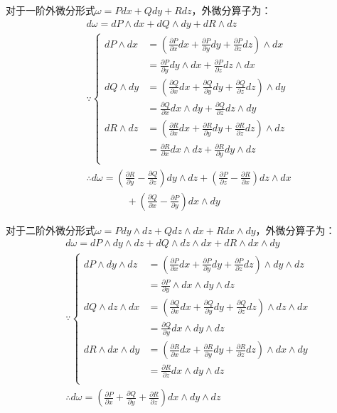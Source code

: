 对于一阶外微分形式$\omega =Pdx+Qdy+Rdz$，外微分算子为：
\begin{align*}
&d\omega =dP\land dx+dQ\land dy+dR\land dz \\
&\because \left\{ \begin{aligned}
	dP\land dx&=\left( \frac{\partial P}{\partial x}dx+\frac{\partial P}{\partial y}dy+\frac{\partial P}{\partial z}dz \right) \land dx\\
	&=\frac{\partial P}{\partial y}dy\land dx+\frac{\partial P}{\partial z}dz\land dx\\
	dQ\land dy&=\left( \frac{\partial Q}{\partial x}dx+\frac{\partial Q}{\partial y}dy+\frac{\partial Q}{\partial z}dz \right) \land dy\\
	&=\frac{\partial Q}{\partial x}dx\land dy+\frac{\partial Q}{\partial z}dz\land dy\\
	dR\land dz&=\left( \frac{\partial R}{\partial x}dx+\frac{\partial R}{\partial y}dy+\frac{\partial R}{\partial z}dz \right) \land dz\\
	&=\frac{\partial R}{\partial x}dx\land dz+\frac{\partial R}{\partial y}dy\land dz\\
\end{aligned} \right. \\
&\therefore d\omega =\left( \frac{\partial R}{\partial y}-\frac{\partial Q}{\partial z} \right) dy\land dz+\left( \frac{\partial P}{\partial z}-\frac{\partial R}{\partial x} \right) dz\land dx \\
& \qquad \qquad +\left( \frac{\partial Q}{\partial x}-\frac{\partial P}{\partial y} \right) dx\land dy
\end{align*}

对于二阶外微分形式$\omega =Pdy\land dz+Qdz\land dx+Rdx\land dy$，外微分算子为：
\begin{align*}
&d\omega =dP\land dy\land dz+dQ\land dz\land dx+dR\land dx\land dy \\
&\because \left\{ \begin{aligned}
	dP\land dy\land dz&=\left( \frac{\partial P}{\partial x}dx+\frac{\partial P}{\partial y}dy+\frac{\partial P}{\partial z}dz \right) \land dy\land dz\\
	&=\frac{\partial P}{\partial y}\land dx\land dy\land dz\\
	dQ\land dz\land dx&=\left( \frac{\partial Q}{\partial x}dx+\frac{\partial Q}{\partial y}dy+\frac{\partial Q}{\partial z}dz \right) \land dz\land dx\\
	&=\frac{\partial Q}{\partial y}dx\land dy\land dz\\
	dR\land dx\land dy&=\left( \frac{\partial R}{\partial x}dx+\frac{\partial R}{\partial y}dy+\frac{\partial R}{\partial z}dz \right) \land dx\land dy\\
	&=\frac{\partial R}{\partial z}dx\land dy\land dz\\
\end{aligned} \right. \\
&\therefore d\omega =\left( \frac{\partial P}{\partial x}+\frac{\partial Q}{\partial y}+\frac{\partial R}{\partial z} \right) dx\land dy\land dz
\end{align*}

